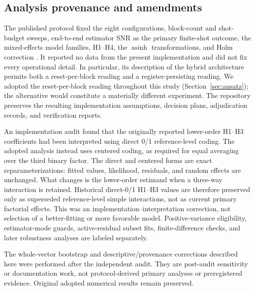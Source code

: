 \documentclass[pdflatex,sn-mathphys-num,Numbered]{sn-jnl}
\begin{document}
\subsection{Analysis provenance and amendments}\label{sec:provenance}

The published protocol fixed the eight configurations, block-count and shot-budget sweeps, end-to-end estimator SNR as the primary finite-shot outcome, the mixed-effects model families, H1--H4, the $\operatorname{asinh}$ transformations, and Holm correction \cite{shen2026gradient}. It reported no data from the present implementation and did not fix every operational detail. In particular, its description of the hybrid architecture permits both a reset-per-block reading and a register-persisting reading. We adopted the reset-per-block reading throughout this study (Section~\ref{sec:ansatz}); the alternative would constitute a materially different experiment. The repository preserves the resulting implementation assumptions, decision plans, adjudication records, and verification reports.

An implementation audit found that the originally reported lower-order H1--H3 coefficients had been interpreted using direct 0/1 reference-level coding. The adopted analysis instead uses centered coding, as required for equal averaging over the third binary factor. The direct and centered forms are exact reparameterizations: fitted values, likelihood, residuals, and random effects are unchanged. What changes is the lower-order estimand when a three-way interaction is retained. Historical direct-0/1 H1--H3 values are therefore preserved only as superseded reference-level simple interactions, not as current primary factorial effects. This was an implementation--interpretation correction, not selection of a better-fitting or more favorable model. Positive-variance eligibility, estimator-mode guards, active-residual subset fits, finite-difference checks, and later robustness analyses are labeled separately.

The whole-vector bootstrap and descriptive/provenance corrections described here were performed after the independent audit. They are post-audit sensitivity or documentation work, not protocol-derived primary analyses or preregistered evidence. Original adopted numerical results remain preserved.
\end{document}
